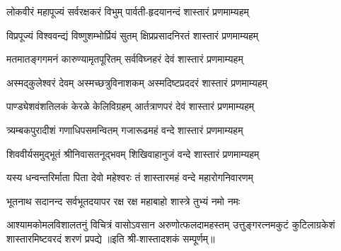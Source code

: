 
\twolineshloka
{लोकवीरं महापूज्यं सर्वरक्षकरं विभुम्}
{पार्वती-हृदयानन्दं शास्तारं प्रणमाम्यहम्}

\twolineshloka
{विप्रपूज्यं विश्ववन्द्यं विष्णुशम्भोर्प्रियं सुतम्}
{क्षिप्रप्रसादनिरतं शास्तारं प्रणमाम्यहम्}

\twolineshloka
{मतमातङ्गगमनं कारुण्यामृतपूरितम्}
{सर्वविघ्नहरं देवं शास्तारं प्रणमाम्यहम्}

\twolineshloka
{अस्मद्कुलेश्वरं देवम् अस्मच्छत्रुविनाशकम्}
{अस्मदिष्टप्रददरं शास्तारं प्रणमाम्यहम्}

\twolineshloka
{पाण्ड्येशवंशतिलकं केरळे केलिविग्रहम्}
{आर्तत्राणपरं देवं शास्तारं प्रणमाम्यहम्}

\twolineshloka
{त्र्यम्बकपुरादीशं गणाधिपसमन्वितम्}
{गजारूढमहं वन्दे शास्तारं प्रणमाम्यहम्}

\twolineshloka
{शिववीर्यसमुद्भूतं श्रीनिवासतनूद्भवम्}
{शिखिवाहानुजं वन्दे शास्तारं प्रणमाम्यहम्}

\twolineshloka
{यस्य धन्वन्तरिर्माता पिता देवो महेश्वरः}
{तं शास्तारमहं वन्दे महारोगनिवारणम्}

\twolineshloka
{भूतनाथ सदानन्द सर्वभूतदयापर}
{रक्ष रक्ष महाबाहो शास्त्रे तुभ्यं नमो नमः}

\fourlineindentedshloka
{आश्यामकोमलविशालतनुं विचित्रं}
{वासोऽवसान अरुणोत्फलदामहस्तम्}
{उत्तुङ्गरत्नमकुटं कुटिलाग्रकेशं}
{शास्तारमिष्टवरदं शरणं प्रपद्ये}
॥इति श्री-शास्तादशकं सम्पूर्णम्॥